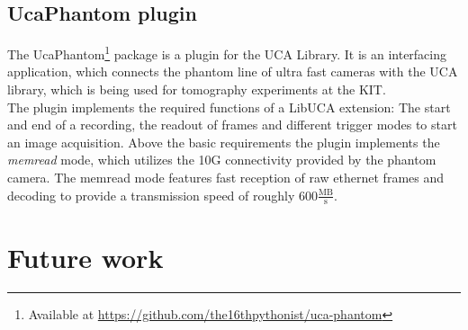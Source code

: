 \subsection{UcaPhantom plugin}

The UcaPhantom\footnote{Available at \url{https://github.com/the16thpythonist/uca-phantom}} package is a plugin for the UCA Library. It is an interfacing application, which connects the phantom line of ultra fast cameras with the UCA library, which is being used for tomography experiments at the KIT.\\
The plugin implements the required functions of a LibUCA extension: The start and end of a recording, the readout of frames and different trigger modes to start an image acquisition. Above the basic requirements the plugin implements the \textit{memread} mode, which utilizes the 10G connectivity provided by the phantom camera. The memread mode features fast reception of raw ethernet frames and decoding to provide a transmission speed of roughly $600 \frac{\text{MB}}{\text{s}}$.



\section{Future work}

